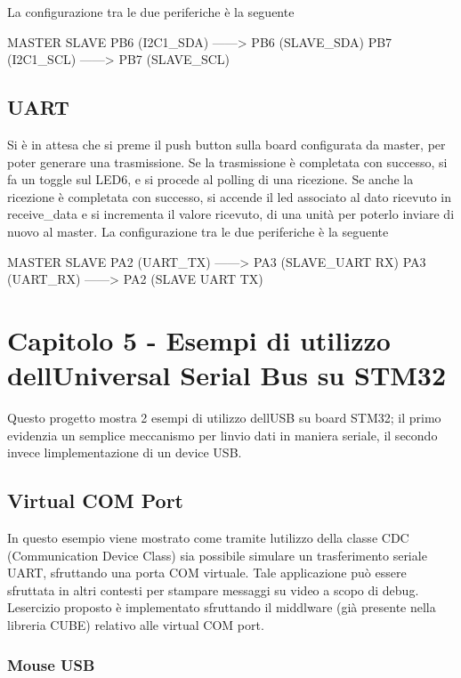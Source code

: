 La configurazione tra le due periferiche è la seguente \begin{DoxyVerb}         MASTER               SLAVE
    PB6 (I2C1_SDA) ------> PB6 (SLAVE_SDA)
    PB7 (I2C1_SCL) ------> PB7 (SLAVE_SCL)
\end{DoxyVerb}
 \hypertarget{index_fourththree}{}\subsection{U\+A\+RT}\label{index_fourththree}
Si è in attesa che si preme il push button sulla board configurata da master, per poter generare una trasmissione. Se la trasmissione è completata con successo, si fa un toggle sul L\+E\+D6, e si procede al polling di una ricezione. Se anche la ricezione è completata con successo, si accende il led associato al dato ricevuto in receive\+\_\+data e si incrementa il valore ricevuto, di una unità per poterlo inviare di nuovo al master. La configurazione tra le due periferiche è la seguente \begin{DoxyVerb}        MASTER      SLAVE
    PA2 (UART_TX) ------> PA3 (SLAVE_UART RX)
    PA3 (UART_RX) ------> PA2 (SLAVE UART TX)
\end{DoxyVerb}
\hypertarget{index_fifth}{}\section{Capitolo 5 -\/ Esempi di utilizzo dell\textquotesingle{}\+Universal Serial Bus su S\+T\+M32}\label{index_fifth}
Questo progetto mostra 2 esempi di utilizzo dell\textquotesingle{}U\+SB su board S\+T\+M32; il primo evidenzia un semplice meccanismo per l\textquotesingle{}invio dati in maniera seriale, il secondo invece l\textquotesingle{}implementazione di un device U\+SB. \hypertarget{index_fifthfirst}{}\subsection{Virtual C\+O\+M Port}\label{index_fifthfirst}
In questo esempio viene mostrato come tramite l\textquotesingle{}utilizzo della classe C\+DC (Communication Device Class) sia possibile simulare un trasferimento seriale U\+A\+RT, sfruttando una porta C\+OM virtuale. Tale applicazione può essere sfruttata in altri contesti per stampare messaggi su video a scopo di debug. L\textquotesingle{}esercizio proposto è implementato sfruttando il middlware (già presente nella libreria C\+U\+BE) relativo alle virtual C\+OM port. \hypertarget{index_fifthsecond}{}\subsubsection{Mouse U\+SB}\label{index_fifthsecond}
